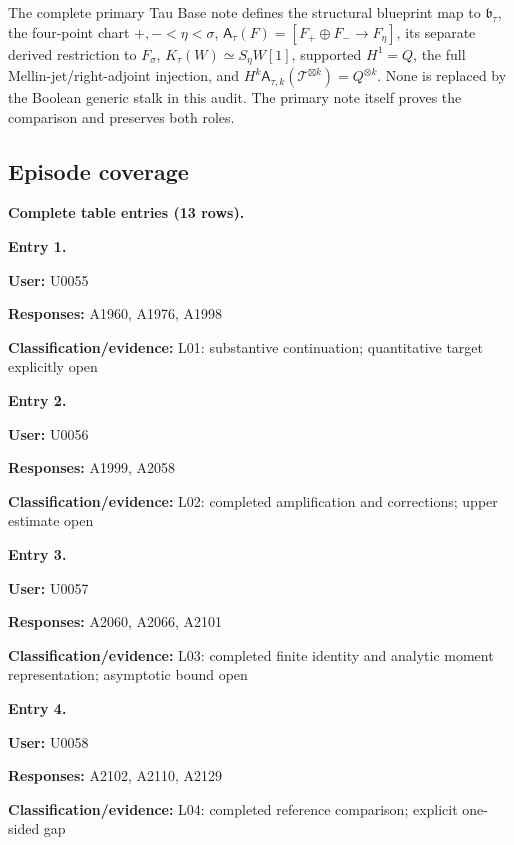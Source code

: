 \documentclass[10pt,a4paper,oneside]{report}
\begin{document}
The complete primary Tau Base note defines the structural blueprint map
to \(\mathfrak b_\tau\), the four-point chart \(+,-<\eta<\sigma\),
\(\mathsf A_\tau(F)=[F_+\oplus F_-\to F_\eta]\), its separate derived
restriction to \(F_\sigma\), \(K_\tau(W)\simeq S_\eta W[1]\), supported
\(H^1=Q\), the full Mellin-jet/right-adjoint injection, and
\(H^k\mathsf A_{\tau,k}(\mathcal T^{\boxtimes k})=Q^{\otimes k}\). None
is replaced by the Boolean generic stalk in this audit. The primary note
itself proves the comparison and preserves both roles.

\subsection{Episode coverage}\label{episode-coverage}

\textbf{Complete table entries (13 rows).}


\textbf{Entry 1.}

\textbf{User:} U0055

\textbf{Responses:} A1960, A1976, A1998

\textbf{Classification/evidence:} L01: substantive continuation;
quantitative target explicitly open


\textbf{Entry 2.}

\textbf{User:} U0056

\textbf{Responses:} A1999, A2058

\textbf{Classification/evidence:} L02: completed amplification and
corrections; upper estimate open


\textbf{Entry 3.}

\textbf{User:} U0057

\textbf{Responses:} A2060, A2066, A2101

\textbf{Classification/evidence:} L03: completed finite identity and
analytic moment representation; asymptotic bound open


\textbf{Entry 4.}

\textbf{User:} U0058

\textbf{Responses:} A2102, A2110, A2129

\textbf{Classification/evidence:} L04: completed reference comparison;
explicit one-sided gap

\end{document}
